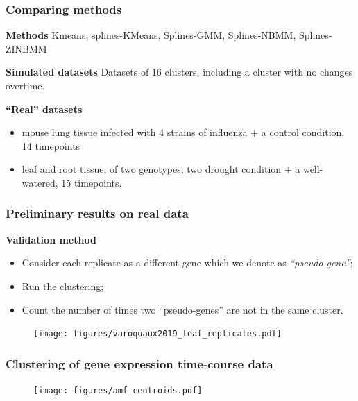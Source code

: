 \documentclass[xcolor=dvipsnames]{beamer}
\begin{document}
\begin{frame}
\frametitle{Comparing methods}

\textbf{\color{Blue} Methods} \quad Kmeans, splines-KMeans, Splines-GMM,
Splines-NBMM, Splines-ZINBMM

\vspace{1em}
\textbf{\color{Blue} Simulated datasets}  Datasets of 16 clusters,
including a cluster with no changes overtime.

\vspace{1em}
\textbf{\color{Blue} ``Real'' datasets} \quad
\begin{itemize}[label={$\bullet$}]
\item \citet{shoemaker:ultrasensitive} mouse lung tissue infected with 4
strains of influenza + a control condition, 14 timepoints
\item \citet{varoquaux:transcriptomic} leaf and root tissue, of two genotypes,
two drought condition + a well-watered, 15 timepoints.
\end{itemize}

\vspace{1em}
\end{frame}

\begin{frame}
\frametitle{Preliminary results on real data}
\textbf{\color{Blue} Validation method}
\begin{itemize}[label={$\bullet$}]
\item Consider each replicate as a different gene which we denote as
\textit{``pseudo-gene''};
\item Run the clustering;
\item Count the number of times two ``pseudo-genes'' are not in the same
cluster.
\end{itemize}
\begin{figure}
\texttt{[image: figures/varoquaux2019\_leaf\_replicates.pdf]}
\end{figure}
\end{frame}

\begin{frame}
\frametitle{Clustering of gene expression time-course data}
\begin{figure}
\texttt{[image: figures/amf\_centroids.pdf]}
\end{figure}

\vspace{1.5em}
\begin{overlayarea}{12cm}{5cm}
\end{overlayarea}
\end{frame}
\end{document}
